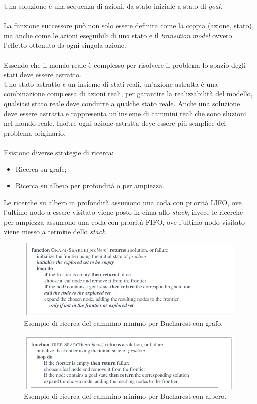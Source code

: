 \documentclass[10pt,a4paper]{book}
\begin{document}
\noindent
Una soluzione \`e una sequenza di azioni, da stato iniziale a stato di \textit{goal}.\\\\
La funzione successore pu\`o non solo essere definita come la coppia (azione, stato), ma anche come le azioni eseguibili di uno stato e il \textit{transition model} ovvero l'effetto ottenuto da ogni singola azione.\\\\
Essendo che il mondo reale \`e complesso per risolvere il problema lo spazio degli stati deve essere astratto.\\
Uno stato astratto \`e un insieme di stati reali, un'azione astratta \`e una combinazione complessa di azioni reali, per garantire la realizzabilit\`a del modello, qualsiasi stato reale deve condurre a qualche stato reale. Anche una soluzione deve essere astratta e rappresenta un'insieme di cammini reali che sono sluzioni nel mondo reale. Inoltre ogni azione astratta deve essere pi\`u semplice del problema originario.\\\\
Esistono diverse strategie di ricerca:
\begin{itemize}
\item Ricerca su grafo;
\item Ricerca su albero per profondit\`a o per ampiezza.
\end{itemize}
\noindent
Le ricerche su albero in profondit\`a assumono una coda con priorit\`a LIFO, ove l'ultimo nodo a essere visitato viene posto in cima allo \textit{stack}, invece le ricerche per ampiezza assumono una coda con priorit\`a FIFO, ove l'ultimo nodo visitato viene messo a termine dello \textit{stack}.

\begin{figure}[H]
\centering
  \includegraphics[width=1\linewidth]{./images/code-grafo.png}
  \caption{Esempio di ricerca del cammino minimo per Bucharest con grafo.}
   \label{fig: esempio-ricerca-grafo}
\end{figure}
\noindent
\begin{figure}[H]
\centering
  \includegraphics[width=1\linewidth]{./images/code-albero.png}
  \caption{Esempio di ricerca del cammino minimo per Bucharest con albero.}
   \label{fig: esempio-ricerca-albero}
\end{figure}
\noindent
\end{document}
